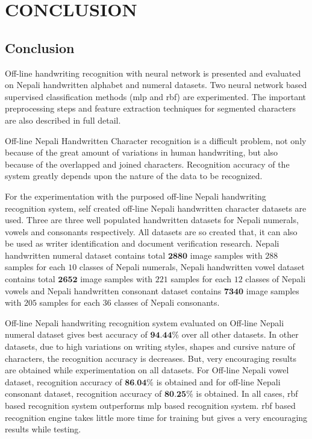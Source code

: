 \newpage
\chapter{CONCLUSION}\label{chapter_conclusion}

\section{Conclusion}

Off-line handwriting recognition with neural network is presented and evaluated on Nepali handwritten alphabet and numeral datasets. Two neural network based supervised classification methods (\ac{mlp} and \ac{rbf}) are experimented. The important preprocessing steps and feature extraction techniques for segmented characters are also described in full detail.

Off-line Nepali Handwritten Character recognition is a difficult problem, not only because of the great amount of variations in human handwriting, but also because of the overlapped and joined characters. Recognition accuracy of the system greatly depends upon the nature of the data to be recognized.

For the experimentation with the purposed off-line Nepali handwriting recognition system, self created off-line Nepali handwritten character datasets are used. Three are three well populated handwritten datasets for Nepali numerals, vowels and consonants respectively. All datasets are so created that, it can also be used as writer identification and document verification research. Nepali handwritten numeral dataset contains total $\textbf{2880}$ image samples with $288$ samples for each $10$ classes of Nepali numerals, Nepali handwritten vowel dataset contains total $\textbf{2652}$ image samples with $221$ samples for each $12$ classes of Nepali vowels and Nepali handwritten consonant dataset contains $\textbf{7340}$ image samples with $205$ samples for each $36$ classes of Nepali consonants.

Off-line Nepali handwriting recognition system evaluated on Off-line Nepali numeral dataset gives best accuracy of $\textbf{94.44\%}$ over all other datasets. In other datasets, due to high variations on writing styles, shapes and cursive nature of characters, the recognition accuracy is decreases. But, very encouraging results are obtained while experimentation on all datasets. For Off-line Nepali vowel dataset, recognition accuracy of $\textbf{86.04\%}$ is obtained and for off-line Nepali consonant dataset, recognition accuracy of $\textbf{80.25\%}$ is obtained. In all cases, \ac{rbf} based recognition system outperforms \ac{mlp} based recognition system. \ac{rbf} based recognition engine takes little more time for training but gives a very encouraging results while testing.

